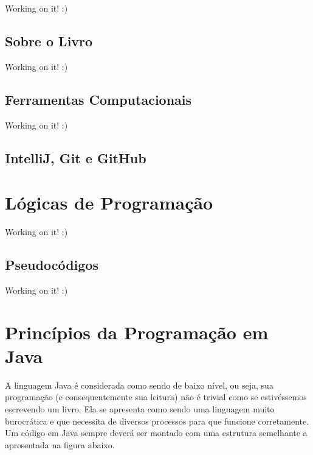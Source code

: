\documentclass[
]{book}
\begin{document}
Working on it! :)

\hypertarget{sobre-o-livro}{%
\section*{Sobre o Livro}\label{sobre-o-livro}}

Working on it! :)

\hypertarget{ferramentas-computacionais}{%
\section*{Ferramentas Computacionais}\label{ferramentas-computacionais}}

Working on it! :)

\hypertarget{intellij-git-e-github}{%
\section{IntelliJ, Git e GitHub}\label{intellij-git-e-github}}

\hypertarget{luxf3gicas-de-programauxe7uxe3o}{%
\chapter{Lógicas de Programação}\label{luxf3gicas-de-programauxe7uxe3o}}

Working on it! :)

\hypertarget{pseudocuxf3digos}{%
\section{Pseudocódigos}\label{pseudocuxf3digos}}

Working on it! :)

\hypertarget{princuxedpios-da-programauxe7uxe3o-em-java}{%
\chapter{Princípios da Programação em Java}\label{princuxedpios-da-programauxe7uxe3o-em-java}}

A linguagem Java é considerada como sendo de baixo nível, ou seja, sua programação (e consequentemente sua leitura) não é trivial como se estivéssemos escrevendo um livro. Ela se apresenta como sendo uma linguagem muito burocrática e que necessita de diversos processos para que funcione corretamente. Um código em Java sempre deverá ser montado com uma estrutura semelhante a apresentada na figura abaixo.
\end{document}
